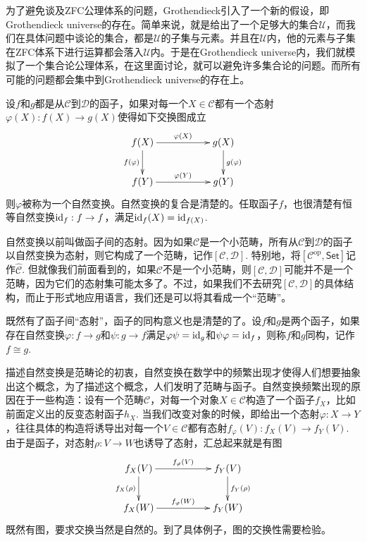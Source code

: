 为了避免谈及ZFC公理体系的问题，Grothendieck引入了一个新的假设，即Grothendieck universe的存在。简单来说，就是给出了一个足够大的集合$\mathscr{U}$，而我们在具体问题中谈论的集合，都是$\mathscr{U}$的子集与元素。并且在$\mathscr{U}$内，他的元素与子集在ZFC体系下进行运算都会落入$\mathscr{U}$内。于是在Grothendieck universe内，我们就模拟了一个集合论公理体系，在这里面讨论，就可以避免许多集合论的问题。而所有可能的问题都会集中到Grothendieck universe的存在上。

\para 设$f$和$g$都是从$\mathcal{C}$到$\mathcal{D}$的函子，如果对每一个$X\in \mathcal{C}$都有一个态射$\varphi(X):f(X)\to g(X)$使得如下交换图成立
\[
\begin{xy}
	\xymatrix{
		f(X)\ar[rr]^{\varphi(X)} \ar[d]_{f(\varphi)}&&g(X) \ar[d]^{g(\varphi)}\\
		f(Y)\ar[rr]^{\varphi(Y)}&&g(Y)
	}
\end{xy}
\]
则$\varphi$被称为一个自然变换。自然变换的复合是清楚的。任取函子$f$，也很清楚有恒等自然变换$\operatorname{id}_f:f\to f$，满足$\operatorname{id}_f(X)=\operatorname{id}_{f(X)}$.

自然变换以前叫做函子间的态射。因为如果$\mathcal{C}$是一个小范畴，所有从$\mathcal{C}$到$\mathcal{D}$的函子以自然变换为态射，则它构成了一个范畴，记作$[\mathcal{C},\mathcal{D}]$. 特别地，将$[\mathcal{C}^\text{op},\mathsf{Set}]$记作$\hat{\mathcal{C}}$. 但就像我们前面看到的，如果$\mathcal{C}$不是一个小范畴，则$[\mathcal{C},\mathcal{D}]$可能并不是一个范畴，因为它们的态射集可能太多了。不过，如果我们不去研究$[\mathcal{C},\mathcal{D}]$的具体结构，而止于形式地应用语言，我们还是可以将其看成一个“范畴”。

既然有了函子间“态射”，函子的同构意义也是清楚的了。设$f$和$g$是两个函子，如果存在自然变换$\varphi:f\to g$和$\psi:g\to f$满足$\varphi\psi=\operatorname{id}_g$和$\psi\varphi=\operatorname{id}_f$，则称$f$和$g$同构，记作$f\cong g$.

描述自然变换是范畴论的初衷，自然变换在数学中的频繁出现才使得人们想要抽象出这个概念，为了描述这个概念，人们发明了范畴与函子。自然变换频繁出现的原因在于一些构造：设有一个范畴$\mathcal{C}$，对每一个对象$X\in \mathcal{C}$构造了一个函子$f_X$，比如前面定义出的反变态射函子$h_X$. 当我们改变对象的时候，即给出一个态射$\varphi:X\to Y$，往往具体的构造将诱导出对每一个$V\in \mathcal{C}$都有态射$f_\varphi(V):f_X(V)\to f_Y(V)$. 由于是函子，对态射$\rho:V\to W$也诱导了态射，汇总起来就是有图
\[
\begin{xy}
	\xymatrix{
		f_X(V)\ar[rr]^{f_\varphi(V)} \ar[d]_{f_X(\rho)}&&f_Y(V) \ar[d]^{f_Y(\rho)}\\
		f_X(W)\ar[rr]^{f_\varphi(W)}&&f_Y(W)
	}
\end{xy}
\]
既然有图，要求交换当然是自然的。到了具体例子，图的交换性需要检验。

